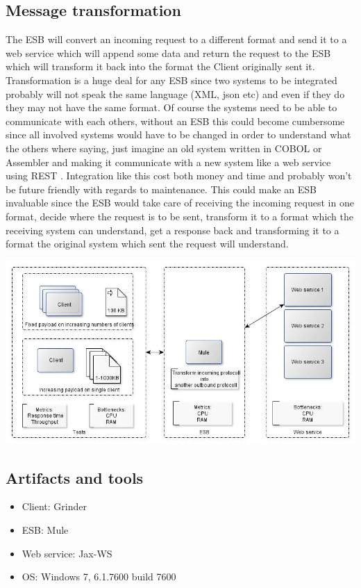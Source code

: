 \subsection{Message transformation}
The ESB will convert an incoming request to a different format and send it to a web service which will append some data and return the request to the ESB which will transform it back into the format the Client originally sent it.
Transformation is a huge deal for any ESB since two systems to be integrated probably will not speak the same language (XML, json etc) and even if they do they may not have the same format. Of course the systems need to be able to communicate with each others, without an ESB this could become cumbersome since all involved systems would have to be changed in order to understand what the others where saying, just imagine an old system written in COBOL or Assembler and making it communicate with a new system like a web service using REST \cite{whatisrest}. Integration like this cost both money and time and probably won't be future friendly with regards to maintenance.
This could make an ESB invaluable since the ESB would take care of receiving the incoming request in one format, decide where the request is to be sent, transform it to a format which the receiving system can understand, get a response back and transforming it to a format the original system which sent the request will understand.

\centerline{\includegraphics[scale=0.43]{img/transformation}}
\subsection{Artifacts and tools}
\begin{itemize}
	\item Client: Grinder \cite{whatisgrinder, kod}
	\item ESB: Mule \cite{whatismule, kod}
	\item Web service: Jax-WS \cite{whatisjaxws, kod}
	\item OS: Windows 7, 6.1.7600 build 7600
\end{itemize}

